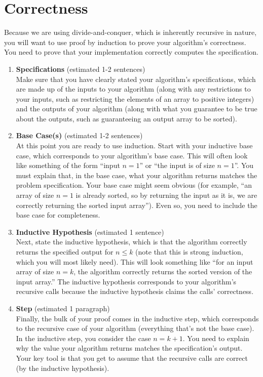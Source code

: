\documentclass[11pt]{article}
\begin{document}
\section{Correctness}
Because we are using divide-and-conquer, which is inherently recursive in nature, you will want to use proof by induction to prove your algorithm's correctness. You need to prove that your implementation correctly computes the specification.
\begin{enumerate}
    \item \textbf{Specifications} (estimated 1-2 sentences) \\
 Make sure that you have clearly stated your algorithm's specifications, which are made up of the inputs to your algorithm (along with any restrictions to your inputs, such as restricting the elements of an array to positive integers) and the outputs of your algorithm (along with what you guarantee to be true about the outputs, such as guaranteeing an output array to be sorted). 

    \item \textbf{Base Case(s)} (estimated 1-2 sentences) \\
At this point you are ready to use induction. Start with your inductive base case, which corresponds to your algorithm's base case. This will often look like something of the form ``input $n = 1$'' or ``the input is of size $n = 1$''. You must explain that, in the base case, what your algorithm returns matches the problem specification. Your base case might seem obvious (for example, ``an array of size $n = 1$ is already sorted, so by returning the input as it is, we are correctly returning the sorted input array''). Even so, you need to include the base case for completeness. 

    \item \textbf{Inductive Hypothesis} (estimated 1 sentence) \\
Next, state the inductive hypothesis, which is that the algorithm correctly returns the specified output for $n \leq k$ (note that this is strong induction, which you will most likely need). This will look something like ``for an input array of size $n = k$, the algorithm correctly returns the sorted version of the input array.'' The inductive hypothesis corresponds to your algorithm's recursive calls because the inductive hypothesis claims the calls' correctness.

    \item \textbf{Step} (estimated 1 paragraph) \\
Finally, the bulk of your proof comes in the inductive step, which corresponds to the recursive case of your algorithm (everything that's not the base case). In the inductive step, you consider the case $n=k+1$. You need to explain why the value your algorithm returns matches the specification's output. Your key tool is that you get to assume that the recursive calls are correct (by the inductive hypothesis).
\end{enumerate}
\end{document}
